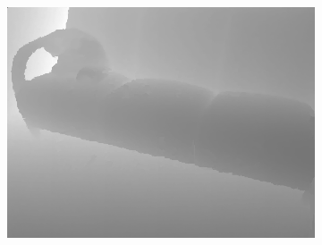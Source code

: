 \documentclass[preprint,10pt,5p,times,twocolumn]{elsarticle}
\begin{document}
\begin{figure}[t]
\begin{center}
\begin{subfigure}[b]{0.136\linewidth}
    \includegraphics[width=\linewidth]{sofa_upsampling_inpainting.png}
\end{subfigure}


\end{center}
\end{figure}
\end{document}
